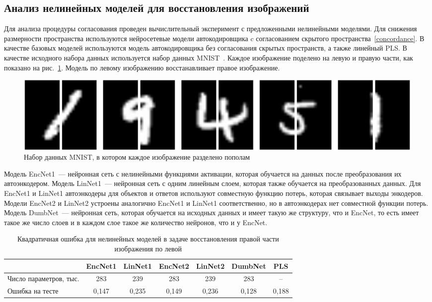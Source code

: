 \subsection{Анализ нелинейных моделей для восстановления изображений}
Для анализа процедуры согласования проведен вычислительный эксперимент с предложенными нелинейными моделями.
Для снижения размерности пространства используются нейросетевые модели автокодировщика c согласованием скрытого пространства~\eqref{concordance}.
В качестве базовых моделей используются модель автокодировщика без согласования скрытых пространств, а также линейный PLS. В качестве исходного набора данных используется набор данных MNIST~\cite{MNIST}. Каждое изображение поделено на левую и правую части, как показано на рис.~\ref{fgr:3}. Модель по левому изображению восстанавливает правое изображение.

\begin{figure}[!tp]
\centering \includegraphics[width=\linewidth]{figs/ch2/left_right_mnist}
\caption{Набор данных MNIST, в котором каждое изображение разделено пополам}
\label{fgr:3}
\end{figure}

Модель EncNet1~--- нейронная сеть с нелинейными функциями активации, которая обучается на данных после преобразования их автоэнкодером. Модель LinNet1~--- нейронная сеть с одним линейным слоем, которая также обучается на преобразованных данных. Для EncNet1 и LinNet1 автоэнкодеры для объектов и ответов используют совместную функцию потерь, которая связывает выходы энкодеров. Модели EncNet2 и LinNet2 устроены аналогично EncNet1 и LinNet1 соответственно, но в автоэнкодерах нет совместной функции потерь. Модель DumbNet~---  нейронная сеть, которая обучается на исходных данных и имеет такую же структуру, что и EncNet, то есть имеет такое же число слоев и в каждом слое такое же количество нейронов, что и у EncNet.

\begin{table}[!bp]
\caption{Квадратичная ошибка для нелинейных моделей в задаче восстановления правой части изображения по левой}
\centering
\begin{tabular}{l|cccccc}
\hline
	& EncNet1 & LinNet1 & EncNet2 & LinNet2 & DumbNet & PLS\\  \hline
	Число параметров, тыс. & 283 & 239 & 283 & 239  & 283 & --\\
	Ошибка на тесте & 0,147 & 0,235 & 0,149 & 0,236 & 0,128 & 0,188 \\
	\hline
\end{tabular}
\label{tbl:2}
\end{table}

